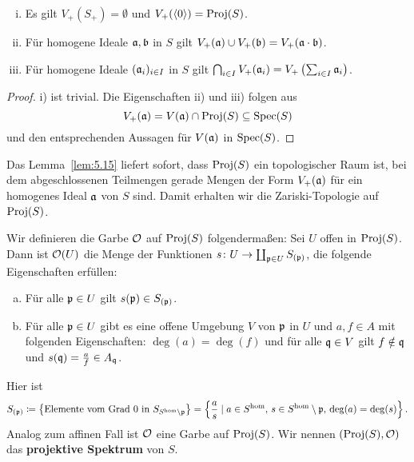 \begin{lem}
\label{lem:5.15}
	\begin{enumerate}[i)]
		\item Es gilt $V_+(S_+) = \emptyset$ und $V_+(\langle 0 \rangle) = \operatorname{Proj}(S)$.
		\item Für homogene Ideale $\mathfrak{a},\mathfrak{b}$ in $S$ gilt $V_+(\mathfrak{a}) \cup V_+(\mathfrak{b}) = V_+(\mathfrak{a} \cdot \mathfrak{b})$.
		\item Für homogene Ideale $(\mathfrak{a}_i)_{i\in I}$ in $S$ gilt $\bigcap_{i\in I}V_+(\mathfrak{a}_i) = V_+\left(\sum_{i\in I}\mathfrak{a}_i\right)$.
	\end{enumerate}
	\begin{proof}
		i) ist trivial. Die Eigenschaften ii) und iii) folgen aus
		\[
			V_+(\mathfrak{a}) = V(\mathfrak{a}) \cap \operatorname{Proj}(S) \subseteq \operatorname{Spec}(S)
		\]
		und den entsprechenden Aussagen für $V(\mathfrak{a})$ in $\operatorname{Spec}(S)$.
	\end{proof}
\end{lem}

\begin{kons}
\label{kons:5.16}
	Das Lemma~\ref{lem:5.15} liefert sofort, dass $\operatorname{Proj}(S)$ ein topologischer Raum ist, bei dem abgeschlossenen Teilmengen gerade Mengen der Form $V_+(\mathfrak{a})$ für ein homogenes Ideal $\mathfrak{a}$ von $S$ sind. Damit erhalten wir die Zariski-Topologie auf $\operatorname{Proj}(S)$.

	Wir definieren die Garbe $\mathcal{O}$ auf $\operatorname{Proj}(S)$ folgendermaßen: Sei $U$ offen in $\operatorname{Proj}(S)$. Dann ist $\mathcal{O}(U)$ die Menge der Funktionen $s\colon U \to \coprod_{\mathfrak{p} \in U}S_{(\mathfrak{p})}$, die folgende Eigenschaften erfüllen:
	\begin{enumerate}[a)]
		\item Für alle $\mathfrak{p} \in U$ gilt $s(\mathfrak{p}) \in S_{(\mathfrak{p})}$.
		\item Für alle $\mathfrak{p} \in U$ gibt es eine offene Umgebung $V$ von $\mathfrak{p}$ in $U$ und $a,f\in A$ mit folgenden Eigenschaften:
                    $\deg(a)=\deg(f)$ und für alle $\mathfrak{q} \in V$ gilt $f \notin \mathfrak{q}$ und $s(\mathfrak{q}) =  \frac{a}{f} \in A_{\mathfrak{q}}$.
	\end{enumerate}
	Hier ist
	\[
		S_{(\mathfrak{p})} \coloneqq \left\lbrace\text{Elemente vom Grad }0 \text{ in } S_{S^{\text{hom}}\setminus\mathfrak{p}} \right\rbrace = \left\lbrace \frac{a}{s} \mid a \in S^{\text{hom}},\, s \in S^{\text{hom}}\setminus \mathfrak{p},\, \deg(a) = \deg(s)\right\rbrace.
	\]
	Analog zum affinen Fall ist $\mathcal{O}$ eine Garbe auf $\operatorname{Proj}(S)$. Wir nennen $(\operatorname{Proj}(S),\mathcal{O})$ das \textbf{projektive Spektrum} von $S$.
\end{kons}

